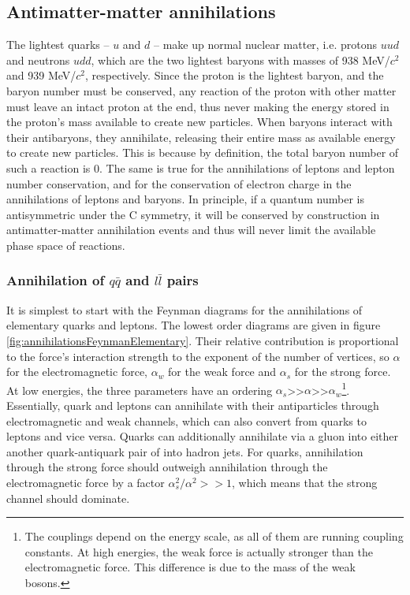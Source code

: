 \subsection{Antimatter-matter annihilations}
The lightest quarks -- $u$ and $d$ -- make up normal nuclear matter, i.e. protons $uud$ and neutrons $udd$, which are the two lightest baryons with masses of 938 MeV/$c^2$ and 939 MeV/$c^2$, respectively. Since the proton is the lightest baryon, and the baryon number must be conserved, any reaction of the proton with other matter must leave an intact proton at the end, thus never making the energy stored in the proton's mass available to create new particles. When baryons interact with their antibaryons, they annihilate, releasing their entire mass as available energy to create new particles. This is because by definition, the total baryon number of such a reaction is 0. The same is true for the annihilations of leptons and lepton number conservation, and for the conservation of electron charge in the annihilations of leptons and baryons. In principle, if a quantum number is antisymmetric under the C symmetry, it will be conserved by construction in antimatter-matter annihilation events and thus will never limit the available phase space of reactions. \\

\subsubsection{Annihilation of $q\bar{q}$ and $l\bar{l}$ pairs}

It is simplest to start with the Feynman diagrams for the annihilations of elementary quarks and leptons. The lowest order diagrams are given in figure \ref{fig:annihilationsFeynmanElementary}. Their relative contribution is proportional to the force's interaction strength to the exponent of the number of vertices, so $\alpha$ for the electromagnetic force, $\alpha_w$ for the weak force and $\alpha_s$ for the strong force. At low energies, the three parameters have an ordering $\alpha_s$>>$\alpha$>>$\alpha_w$\footnote{The couplings depend on the energy scale, as all of them are running coupling constants. At high energies, the weak force is actually stronger than the electromagnetic force. This difference is due to the mass of the weak bosons.}. Essentially, quark and leptons can annihilate with their antiparticles through electromagnetic and weak channels, which can also convert from quarks to leptons and vice versa. Quarks can additionally annihilate via a gluon into either another quark-antiquark pair of into hadron jets. For quarks, annihilation through the strong force should outweigh annihilation through the electromagnetic force by a factor $\alpha_s^2/\alpha^2 >>1$, which means that the strong channel should dominate. 

